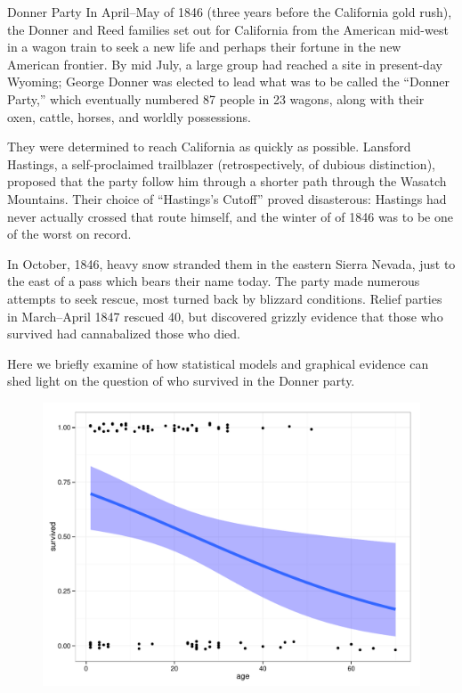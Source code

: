 \documentclass[11pt]{book}
\renewenvironment{knitrout}{\small\renewcommand{\baselinestretch}{.85}}{} %
\begin{document}
\begin{Example}[donner0]{Donner Party}
In April--May of 1846 (three years before the California gold rush),
the Donner and Reed families set out for California from the American mid-west
in a wagon train to seek a new life and perhaps their fortune in the new
American frontier.
By mid July, a large group had reached a site
in present-day Wyoming;  George Donner was elected to lead what was
to be called the ``Donner Party,'' which eventually numbered 87 people
in 23 wagons, along with their oxen, cattle, horses, and worldly possessions.

They were determined to reach California as quickly as possible.
Lansford Hastings, a self-proclaimed trailblazer (retrospectively,
of dubious distinction), proposed that the party follow him through
a shorter path through the Wasatch Mountains.  Their choice
of ``Hastings's Cutoff'' proved disasterous: Hastings had never
actually crossed that route himself, and the winter of of 1846 was to
be one of the worst on record.

In October, 1846, heavy snow stranded them in the eastern Sierra
Nevada, just to the east of a pass which bears their name today.
The party made numerous attempts to seek rescue, most turned back
by blizzard conditions. Relief parties in March--April 1847 rescued
40, but discovered grizzly evidence that those who survived had
cannabalized those who died.

Here we briefly examine of how statistical models and
graphical evidence can shed light on the question of
who survived in the Donner party.

\begin{knitrout}
\color{fgcolor}\begin{figure}[!htbp]


\centerline{\includegraphics[width=.7\textwidth]{ch01/fig/donner0} }


\end{figure}
\end{knitrout}
\end{Example}
\end{document}
